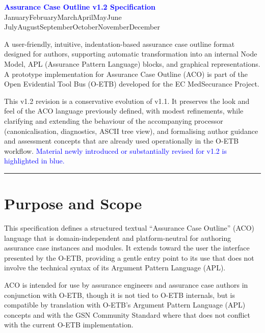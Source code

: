 \documentclass[11pt,twoside,a4paper]{article}
\newcommand{\eudate}{\number\day\space
  \ifcase\month\or
  January\or February\or March\or April\or May\or June\or
  July\or August\or September\or October\or November\or December\fi
  \space\number\year}
\begin{document}
\thispagestyle{empty}

\begin{center}
{\LARGE \textbf{\textcolor{blue}{Assurance Case Outline v1.2 Specification}}}\\[0.5em]
\eudate
\end{center}

A user-friendly, intuitive, indentation-based assurance case outline format designed for authors, supporting automatic transformation into an internal Node Model, APL (Assurance Pattern Language) blocks, and graphical representations.
A prototype implementation for Assurance Case Outline (ACO) is part of the Open Evidential Tool Bus (O-ETB) developed for the EC MedSecurance Project.

This v1.2 revision is a conservative evolution of v1.1. It preserves the look and feel of the ACO language previously defined, with modest refinements, while clarifying and extending the behaviour of the accompanying processor (canonicalisation, diagnostics, ASCII tree view), and formalising author guidance and assessment concepts that are already used operationally in the O-ETB workflow.
\textcolor{blue}{Material newly introduced or substantially revised for v1.2 is highlighted in blue.}

\bigskip
\hrule
\bigskip

\clearpage
\tableofcontents

\clearpage
{}
\setcounter{page}{1}


\clearpage
\section{Purpose and Scope}

This specification defines a structured textual ``Assurance Case Outline'' (ACO) language that is domain-independent and platform-neutral for authoring assurance case instances and modules. It extends toward the user the interface presented by the O-ETB, providing a gentle entry point to its use that does not involve the technical syntax of its Argument Pattern Language (APL).


ACO is intended for use by assurance engineers and assurance case authors in conjunction with O-ETB, though it is not tied to O-ETB internals, but is compatible by translation with O-ETB's Argument Pattern Language (APL) concepts and with the GSN Community Standard where that does not conflict with the current O-ETB implementation.
\end{document}
